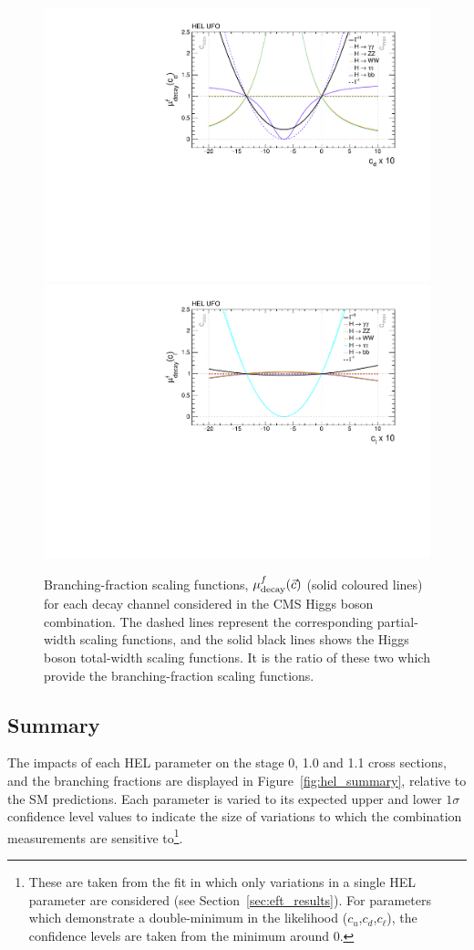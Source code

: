 \begin{figure}
  \includegraphics[width=.49\textwidth]{Figures/eft/scaling_functions/decay_vs_cd.pdf}
  \includegraphics[width=.49\textwidth]{Figures/eft/scaling_functions/decay_vs_cl.pdf}
  \caption[HEL branching-fraction scaling functions]
  {
    Branching-fraction scaling functions, $\mu_{\rm{decay}}^f(\vec{c})$ (solid coloured lines) for each decay channel considered in the CMS Higgs boson combination. The dashed lines represent the corresponding partial-width scaling functions, and the solid black lines shows the Higgs boson total-width scaling functions. It is the ratio of these two which provide the branching-fraction scaling functions.
  }
  \label{fig:eft_decay}
\end{figure}

\subsection{Summary}
The impacts of each HEL parameter on the stage 0, 1.0 and 1.1 cross sections, and the branching fractions are displayed in Figure~\ref{fig:hel_summary}, relative to the SM predictions. Each parameter is varied to its expected upper and lower $1\sigma$ confidence level values to indicate the size of variations to which the combination measurements are sensitive to\footnote{These are taken from the fit in which only variations in a single HEL parameter are considered (see Section~\ref{sec:eft_results}). For parameters which demonstrate a double-minimum in the likelihood ($c_u$,$c_d$,$c_\ell$), the confidence levels are taken from the minimum around 0.}. 


